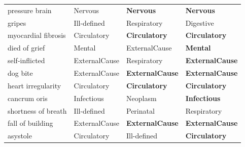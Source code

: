 \documentclass[11pt]{article}
\begin{document}
\begin{table}[h]
\begin{tabular}{llll}
pressure brain & Nervous & \textbf{Nervous} & \textbf{Nervous} \\
gripes & Ill-defined & Respiratory & Digestive \\
myocardial fibrosis & Circulatory & \textbf{Circulatory} & \textbf{Circulatory} \\
died of grief & Mental & ExternalCause & \textbf{Mental} \\
self-inflicted & ExternalCause & Respiratory & \textbf{ExternalCause} \\
dog bite & ExternalCause & \textbf{ExternalCause} & \textbf{ExternalCause} \\
heart irregularity & Circulatory & \textbf{Circulatory} & \textbf{Circulatory} \\
cancrum oris & Infectious & Neoplasm & \textbf{Infectious} \\
shortness of breath & Ill-defined & Perinatal & Respiratory \\
fall of building & ExternalCause & \textbf{ExternalCause} & \textbf{ExternalCause} \\
asystole & Circulatory & Ill-defined & \textbf{Circulatory} \\
\bottomrule
\end{tabular}
\end{table}
\end{document}
